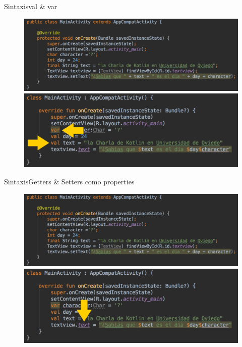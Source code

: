 \begin{frame}{Sintaxis}{val \& var}
    \begin{figure}[h]
    \centering
    \includegraphics[width=\textwidth]{images/kotlin_vs_java/java_basic}
    \vspace{0pt}
    \includegraphics[width=\textwidth]{images/kotlin_vs_java/kotlin_val_var}
    \end{figure}
\end{frame}

\begin{frame}{Sintaxis}{Getters \& Setters como properties}
    \begin{figure}[h]
    \centering
    \includegraphics[width=\textwidth]{images/kotlin_vs_java/java_basic}
    \vspace{0pt}
    \includegraphics[width=\textwidth]{images/kotlin_vs_java/kotlin_properties}
    \end{figure}
\end{frame}

